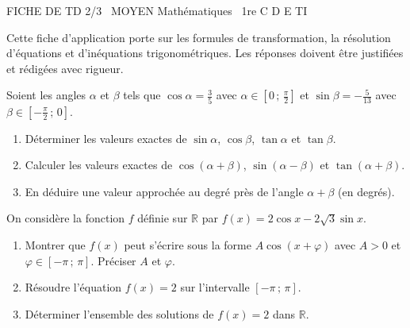 \documentclass[11pt]{article}
\begin{document}
\begin{tcolorbox}[enhanced,colback=popink,colframe=popink,arc=10pt,boxrule=0pt,left=12pt,right=12pt,top=9pt,bottom=9pt]
{\color{white}\popxbold\small FICHE DE TD 2/3 \textbullet\ MOYEN \hfill Mathématiques \textbullet\ 1re C D E TI\par}
\end{tcolorbox}
\vspace{4pt}
\noindent Cette fiche d'application porte sur les formules de transformation, la résolution d'équations et d'inéquations trigonométriques. Les réponses doivent être justifiées et rédigées avec rigueur.

\begin{exercice}
Soient les angles $\alpha$ et $\beta$ tels que $\cos\alpha = \frac{3}{5}$ avec $\alpha\in\left[0\,;\,\frac{\pi}{2}\right]$ et $\sin\beta = -\frac{5}{13}$ avec $\beta\in\left[-\frac{\pi}{2}\,;\,0\right]$.
\begin{enumerate}
    \item Déterminer les valeurs exactes de $\sin\alpha$, $\cos\beta$, $\tan\alpha$ et $\tan\beta$.
    \item Calculer les valeurs exactes de $\cos(\alpha+\beta)$, $\sin(\alpha-\beta)$ et $\tan(\alpha+\beta)$.
    \item En déduire une valeur approchée au degré près de l'angle $\alpha+\beta$ (en degrés).
\end{enumerate}
\end{exercice}

\begin{exercice}
On considère la fonction $f$ définie sur $\mathbb{R}$ par $f(x) = 2\cos x - 2\sqrt{3}\sin x$.
\begin{enumerate}
    \item Montrer que $f(x)$ peut s'écrire sous la forme $A\cos(x+\varphi)$ avec $A>0$ et $\varphi\in\left[-\pi\,;\,\pi\right]$. Préciser $A$ et $\varphi$.
    \item Résoudre l'équation $f(x) = 2$ sur l'intervalle $\left[-\pi\,;\,\pi\right]$.
    \item Déterminer l'ensemble des solutions de $f(x) = 2$ dans $\mathbb{R}$.
\end{enumerate}
\end{exercice}
\end{document}
